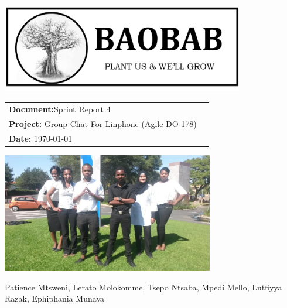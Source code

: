 \begin{titlepage}

\begin{center}

\includegraphics[width=400px]{pictures/logo.jpg}
\vspace{0.5 cm}
\begin{flushright} \large
\begin{tabular}{lr}
\vspace{1 cm}
\LARGE\textbf{Document:}Sprint Report 4\\

\vspace{1 cm}
\LARGE\textbf{Project:} Group Chat For Linphone (Agile DO-178)\\
\LARGE\textbf{Date: }\today\\
\end{tabular}
\end{flushright}

\centering \includegraphics[width=350px]{pictures/Team.jpg}

Patience Mtsweni, Lerato Molokomme, Tsepo Ntsaba, Mpedi Mello, Lutfiyya Razak, Ephiphania Munava\\


\end{center}
\end{titlepage}